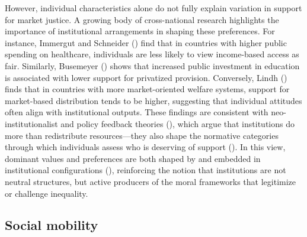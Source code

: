\documentclass[
  13pt,
]{article}
\begin{document}
However, individual characteristics alone do not fully explain variation
in support for market justice. A growing body of cross-national research
highlights the importance of institutional arrangements in shaping these
preferences. For instance, Immergut and Schneider
() find that in countries with
higher public spending on healthcare, individuals are less likely to
view income-based access as fair. Similarly, Busemeyer
() shows that increased public
investment in education is associated with lower support for privatized
provision. Conversely, Lindh ()
finds that in countries with more market-oriented welfare systems,
support for market-based distribution tends to be higher, suggesting
that individual attitudes often align with institutional outputs. These
findings are consistent with neo-institutionalist and policy feedback
theories (),
which argue that institutions do more than redistribute resources---they
also shape the normative categories through which individuals assess who
is deserving of support
(). In this
view, dominant values and preferences are both shaped by and embedded in
institutional configurations
(), reinforcing the
notion that institutions are not neutral structures, but active
producers of the moral frameworks that legitimize or challenge
inequality.

\subsection{Social mobility}\label{social-mobility}
\end{document}
